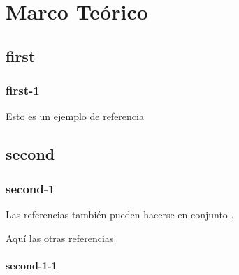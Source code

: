 \chapter{Marco Te\'orico}

\section{first}

\subsection{first-1}
Esto es un ejemplo de referencia \cite{STRO01}

\section{second}

\subsection{second-1}
Las referencias tambi\'en pueden hacerse en conjunto \cite{REF_MIC,WEB99}.

\noindent Aqu\'i las otras referencias \cite{RAM11} \cite{RAM_TEC10}

\subsubsection{second-1-1}